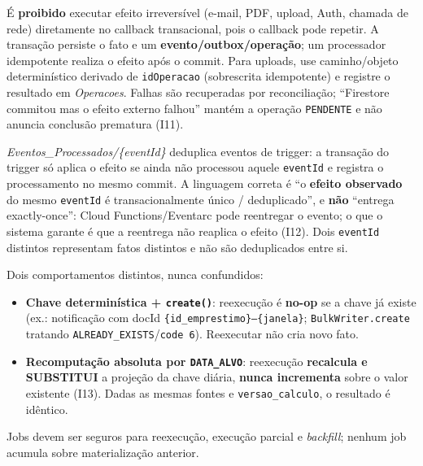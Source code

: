 \begin{regra}
É \textbf{proibido} executar efeito irreversível (e-mail, PDF, upload, Auth, chamada de rede) diretamente no callback transacional, pois o callback pode repetir. A transação persiste o fato e um \textbf{evento/outbox/operação}; um processador idempotente realiza o efeito após o commit. Para uploads, use caminho/objeto determinístico derivado de \texttt{idOperacao} (sobrescrita idempotente) e registre o resultado em \textit{Operacoes}. Falhas são recuperadas por reconciliação; ``Firestore commitou mas o efeito externo falhou'' mantém a operação \texttt{PENDENTE} e não anuncia conclusão prematura (I11).
\end{regra}

\begin{regra}
\textit{Eventos\_Processados/\{eventId\}} deduplica eventos de trigger: a transação do trigger só aplica o efeito se ainda não processou aquele \texttt{eventId} e registra o processamento no mesmo commit. A linguagem correta é ``o \textbf{efeito observado} do mesmo \texttt{eventId} é transacionalmente único / deduplicado'', e \textbf{não} ``entrega exactly-once'': Cloud Functions/Eventarc pode reentregar o evento; o que o sistema garante é que a reentrega não reaplica o efeito (I12). Dois \texttt{eventId} distintos representam fatos distintos e não são deduplicados entre si.
\end{regra}

\begin{regra}
Dois comportamentos distintos, nunca confundidos:
\begin{itemize}
    \item \textbf{Chave determinística + \texttt{create()}}: reexecução é \textbf{no-op} se a chave já existe (ex.: notificação com docId \texttt{\{id\_emprestimo\}--\{janela\}}; \texttt{BulkWriter.create} tratando \texttt{ALREADY\_EXISTS}/\texttt{code 6}). Reexecutar não cria novo fato.
    \item \textbf{Recomputação absoluta por \texttt{DATA\_ALVO}}: reexecução \textbf{recalcula e SUBSTITUI} a projeção da chave diária, \textbf{nunca incrementa} sobre o valor existente (I13). Dadas as mesmas fontes e \texttt{versao\_calculo}, o resultado é idêntico.
\end{itemize}
Jobs devem ser seguros para reexecução, execução parcial e \textit{backfill}; nenhum job acumula sobre materialização anterior.
\end{regra}

